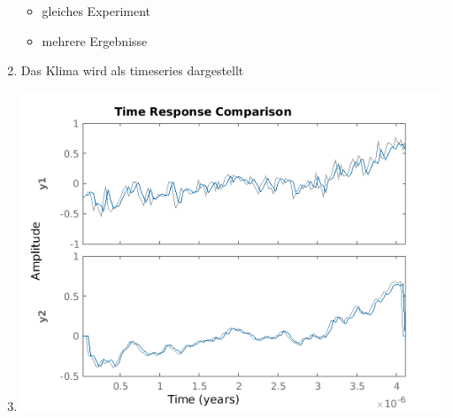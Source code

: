 \begin{enumerate}
\begin{itemize}
		\item gleiches Experiment
		\item mehrere Ergebnisse
	\end{itemize}
	\item Das Klima wird als timeseries dargestellt
	\item \includegraphics{Graphik/climate_timeseries}
\end{enumerate}
